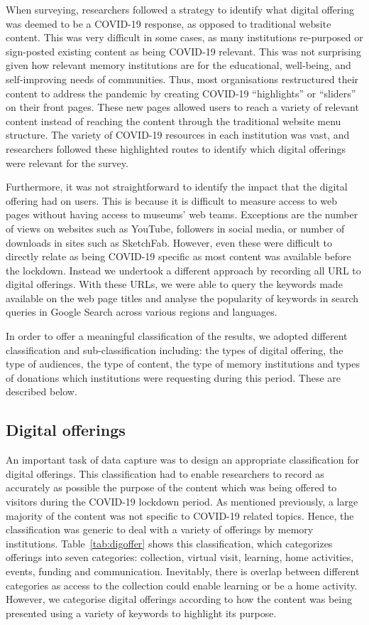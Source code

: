 \documentclass{egpubl}
\begin{document}
When surveying, researchers followed a strategy to identify what digital offering was deemed to be a COVID-19 response, as opposed to traditional website content. This was very difficult in some cases, as many institutions re-purposed or sign-posted existing content as being COVID-19 relevant. This was not surprising given how relevant memory institutions are for the educational, well-being, and self-improving needs of communities. Thus, most organisations restructured their content to address the pandemic by creating COVID-19 “highlights” or “sliders” on their front pages. These new pages allowed users to reach a variety of relevant content instead of reaching the content through the traditional website menu structure. The variety of COVID-19 resources in each institution was vast, and researchers followed these highlighted routes to identify which digital offerings were relevant for the survey.

Furthermore, it was not straightforward to identify the impact that the digital offering had on users. This is because it is difficult to measure access to web pages without having access to museums’ web teams. Exceptions are the number of views on websites such as YouTube, followers in social media, or number of downloads in sites such as SketchFab. However, even these were difficult to directly relate as being COVID-19 specific as most content was available before the lockdown. Instead we undertook a different approach by recording all URL to digital offerings. With these URLs, we were able to query the keywords made available on the web page titles and analyse the popularity of keywords in search queries in Google Search across various regions and languages. 

In order to offer a meaningful classification of the results, we adopted different classification and sub-classification including: the types of digital offering, the type of audiences, the type of content, the type of memory institutions and types of donations which institutions were requesting during this period. These are described below.

\subsection{Digital offerings}
An important task of data capture was to design an appropriate classification for digital offerings. This classification had to enable researchers to record as accurately as possible the purpose of the content which was being offered to visitors during the COVID-19 lockdown period. As mentioned previously, a large majority of the content was not specific to COVID-19 related topics. Hence, the classification was generic to deal with a variety of offerings by memory institutions. Table~\ref{tab:digoffer} shows this classification, which categorizes offerings into seven categories: collection, virtual visit, learning, home activities, events, funding and communication. Inevitably, there is overlap between different categories as access to the collection could enable learning or be a home activity. However, we categorise digital offerings according to how the content was being presented using a variety of keywords to highlight its purpose. 
\end{document}
